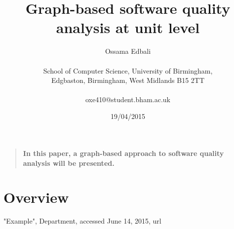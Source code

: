 \documentclass[12pt]{article}
\title{Graph-based software quality analysis at unit level}
\author
{Ossama Edbali\\
\\
\normalsize{School of Computer Science, University of Birmingham,}\\
\normalsize{Edgbaston, Birmingham, West Midlands B15 2TT}\\
\\
\normalsize{oxe410@student.bham.ac.uk}
}
\date{19/04/2015}
\newenvironment{mabstract}{%
\begin{quote} \bf}
{\end{quote}}
\begin{document}
 


\baselineskip24pt

\maketitle 


\begin{mabstract}
	In this paper, a graph-based approach to software quality analysis will be presented.
\end{mabstract}

\section*{Overview}


\begin{thebibliography}{9}
  	"Example",
  	Department,
  	accessed June 14, 2015,
  	url
\end{thebibliography}
\end{document}
